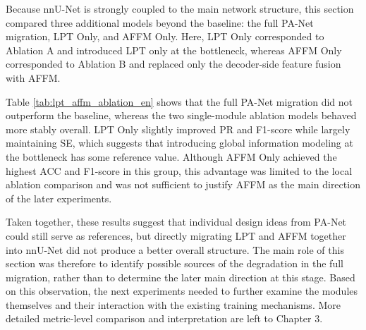 \documentclass[a4paper,12pt]{article}
\begin{document}
Because nnU-Net is strongly coupled to the main network structure, this section compared three additional models beyond the baseline: the full PA-Net migration, LPT Only, and AFFM Only. Here, LPT Only corresponded to Ablation A and introduced LPT only at the bottleneck, whereas AFFM Only corresponded to Ablation B and replaced only the decoder-side feature fusion with AFFM.

\begin{table}[htbp]
\centering
\caption{Comparison of LPT and AFFM ablation results}
\label{tab:lpt_affm_ablation_en}
\end{table}

Table \ref{tab:lpt_affm_ablation_en} shows that the full PA-Net migration did not outperform the baseline, whereas the two single-module ablation models behaved more stably overall. LPT Only slightly improved PR and F1-score while largely maintaining SE, which suggests that introducing global information modeling at the bottleneck has some reference value. Although AFFM Only achieved the highest ACC and F1-score in this group, this advantage was limited to the local ablation comparison and was not sufficient to justify AFFM as the main direction of the later experiments.

Taken together, these results suggest that individual design ideas from PA-Net could still serve as references, but directly migrating LPT and AFFM together into nnU-Net did not produce a better overall structure. The main role of this section was therefore to identify possible sources of the degradation in the full migration, rather than to determine the later main direction at this stage. Based on this observation, the next experiments needed to further examine the modules themselves and their interaction with the existing training mechanisms. More detailed metric-level comparison and interpretation are left to Chapter 3.
\end{document}

